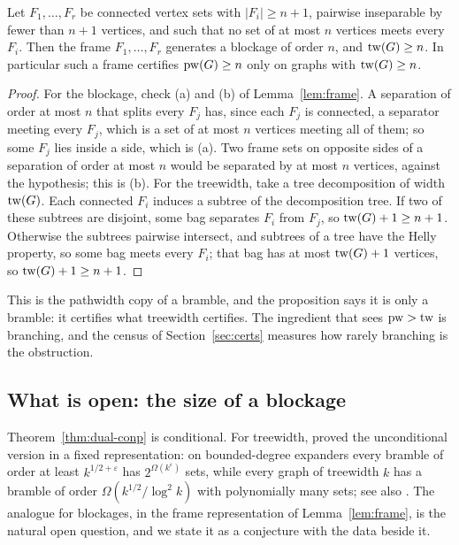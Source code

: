 \begin{proposition}\label{prop:connected-frames}
Let $F_1,\dots,F_r$ be connected vertex sets with $|F_i|\ge n+1$, pairwise
inseparable by fewer than $n+1$ vertices, and such that no set of at most
$n$ vertices meets every $F_i$. Then the frame $F_1,\dots,F_r$ generates a
blockage of order $n$, and $\mathrm{tw}(G)\ge n$. In particular such a frame
certifies $\mathrm{pw}(G)\ge n$ only on graphs with $\mathrm{tw}(G)\ge n$.
\end{proposition}
\begin{proof}
For the blockage, check (a) and (b) of Lemma~\ref{lem:frame}. A separation
of order at most $n$ that splits every $F_j$ has, since each $F_j$ is
connected, a separator meeting every $F_j$, which is a set of at most $n$
vertices meeting all of them; so some $F_j$ lies inside a side, which is
(a). Two frame sets on opposite sides of a separation of order at most $n$
would be separated by at most $n$ vertices, against the hypothesis; this is
(b). For the treewidth, take a tree decomposition of width $\mathrm{tw}(G)$. Each
connected $F_i$ induces a subtree of the decomposition tree. If two of these
subtrees are disjoint, some bag separates $F_i$ from $F_j$, so
$\mathrm{tw}(G)+1\ge n+1$. Otherwise the subtrees pairwise intersect, and subtrees
of a tree have the Helly property, so some bag meets every $F_i$; that bag
has at most $\mathrm{tw}(G)+1$ vertices, so $\mathrm{tw}(G)+1\ge n+1$.
\end{proof}

This is the pathwidth copy of a bramble, and the proposition says it is only
a bramble: it certifies what treewidth certifies. The ingredient that sees
$\mathrm{pw}>\mathrm{tw}$ is branching, and the census of Section~\ref{sec:certs} measures
how rarely branching is the obstruction.

\subsection{What is open: the size of a blockage}

Theorem~\ref{thm:dual-conp} is conditional. For treewidth,
\citet{GroheMarx2009} proved the unconditional version in a fixed
representation: on bounded-degree expanders every bramble of order at least
$k^{1/2+\varepsilon}$ has $2^{\Omega(k^{\varepsilon})}$ sets, while every
graph of treewidth $k$ has a bramble of order
$\Omega(k^{1/2}/\log^2 k)$ with polynomially many sets; see also
\citet{HatzelKomosaPilipczukSorge2022}. The analogue for blockages, in the
frame representation of Lemma~\ref{lem:frame}, is the natural open
question, and we state it as a conjecture with the data beside it.

